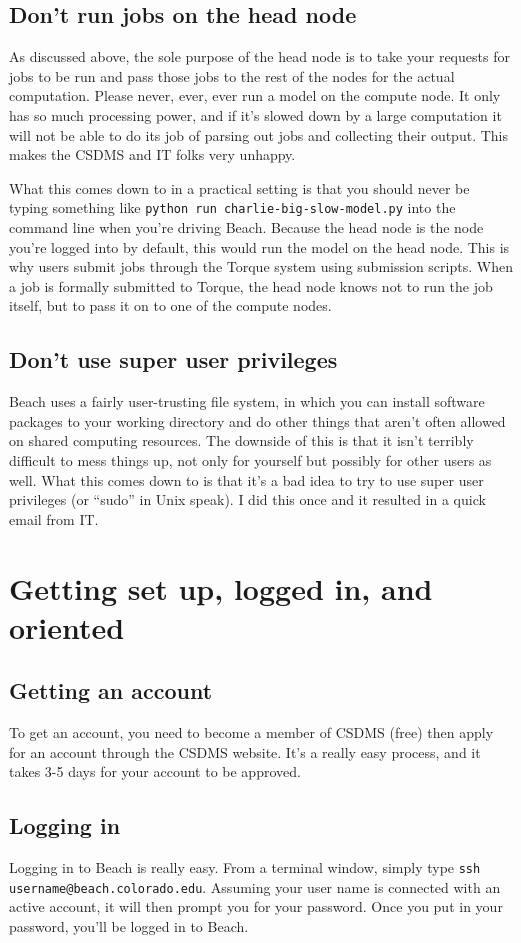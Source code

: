 \documentclass[12pt, oneside]{article}   	%
\begin{document}
\subsection{Don't run jobs on the head node}
As discussed above, the sole purpose of the head node is to take your requests for jobs to be run and pass those jobs to the rest of the nodes for the actual computation. Please never, \Large{ever,} \Huge{ever} \normalsize run a model on the compute node. It only has so much processing power, and if it's slowed down by a large computation it will not be able to do its job of parsing out jobs and collecting their output. This makes the CSDMS and IT folks very unhappy.\par
What this comes down to in a practical setting is that you should never be typing something like \texttt{python run charlie-big-slow-model.py} into the command line when you're driving Beach. Because the head node is the node you're logged into by default, this would run the model on the head node. This is why users submit jobs through the Torque system using submission scripts. When a job is formally submitted to Torque, the head node knows not to run the job itself, but to pass it on to one of the compute nodes.
\subsection{Don't use super user privileges}
Beach uses a fairly user-trusting file system, in which you can install software packages to your working directory and do other things that aren't often allowed on shared computing resources. The downside of this is that it isn't terribly difficult to mess things up, not only for yourself but possibly for other users as well. What this comes down to is that it's a bad idea to try to use super user privileges (or ``sudo'' in Unix speak). I did this once and it resulted in a quick email from IT. 

\section{Getting set up, logged in, and oriented}
\subsection{Getting an account}
To get an account, you need to become a member of CSDMS (free) then apply for an account through the CSDMS website. It's a really easy process, and it takes 3-5 days for your account to be approved.
\subsection{Logging in}
Logging in to Beach is really easy. From a terminal window, simply type \texttt{ssh username@beach.colorado.edu}. Assuming your user name is connected with an active account, it will then prompt you for your password. Once you put in your password, you'll be logged in to Beach.
\end{document}
